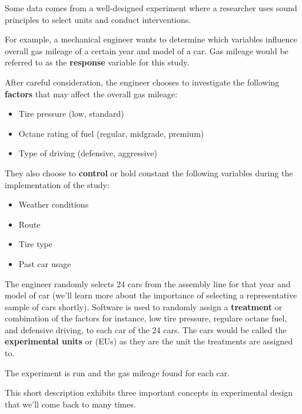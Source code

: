 \documentclass[]{book}
\providecommand{\tightlist}{%
  \setlength{\itemsep}{0pt}\setlength{\parskip}{0pt}}
\begin{document}
Some data comes from a well-designed experiment where a researcher uses
sound principles to select units and conduct interventions.

For example, a mechanical engineer wants to determine which variables
influence overall gas mileage of a certain year and model of a car. Gas
mileage would be referred to as the \textbf{response} variable for this
study.

After careful consideration, the engineer chooses to investigate the
following \textbf{factors} that may affect the overall gas mileage:

\begin{itemize}
\tightlist
\item
  Tire pressure (low, standard)\\
\item
  Octane rating of fuel (regular, midgrade, premium)\\
\item
  Type of driving (defensive, aggressive)
\end{itemize}

They also choose to \textbf{control} or hold constant the following
variables during the implementation of the study:

\begin{itemize}
\tightlist
\item
  Weather conditions\\
\item
  Route\\
\item
  Tire type\\
\item
  Past car usage
\end{itemize}

The engineer randomly selects 24 cars from the assembly line for that
year and model of car (we'll learn more about the importance of
selecting a representative sample of cars shortly). Software is used to
randomly assign a \textbf{treatment} or combination of the factors for
instance, low tire pressure, regulare octane fuel, and defensive
driving, to each car of the 24 cars. The cars would be called the
\textbf{experimental units} or (EUs) as they are the unit the treatments
are assigned to.

The experiment is run and the gas mileage found for each car.

This short description exhibits three important concepts in experimental
design that we'll come back to many times.
\end{document}
